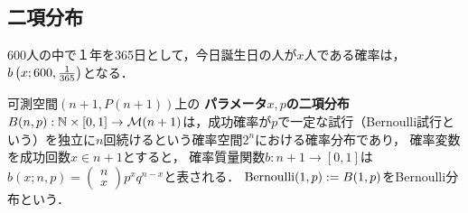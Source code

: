 \documentclass[uplatex,dvipdfmx]{jsreport}
\begin{document}
\subsection{二項分布}

\begin{tcolorbox}[colframe=ForestGreen, colback=ForestGreen!10!white,breakable,colbacktitle=ForestGreen!40!white,coltitle=black,fonttitle=\bfseries\sffamily,
title=]
    600人の中で１年を365日として，今日誕生日の人が$x$人である確率は，$b\left(x;600,\frac{1}{365}\right)$となる．
\end{tcolorbox}

\begin{definition}
    可測空間$(n+1,P(n+1))$上の
    \textbf{パラメータ$x,p$の二項分布}$B(n,p):\mathbb{N}\times[0,1]\to\mathcal{M}(n+1)$は，成功確率が$p$で一定な試行（Bernoulli試行という）を独立に$n$回続けるという確率空間$2^n$における確率分布であり，
    確率変数を成功回数$x\in n+1$とすると，
    確率質量関数$b:n+1\to[0,1]$は$b(x;n,p)=\begin{pmatrix}n\\x\end{pmatrix}p^xq^{n-x}$と表される．
    $\mathrm{Bernoulli}(1,p):=B(1,p)$をBernoulli分布という．
\end{definition}
\end{document}
